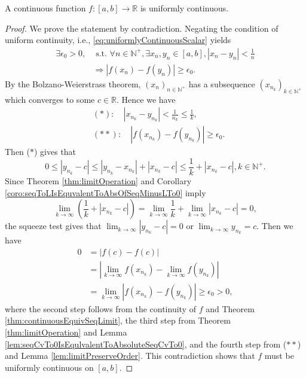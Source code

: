 \begin{thm}
  \label{thm:uniformContinuityScalarFunc}
  A continuous function $f: [a,b]\rightarrow \mathbb{R}$
  is uniformly continuous.
\end{thm}
\begin{proof}
  We prove the statement by contradiction.
  Negating the condition of uniform continuity, i.e.,
  \eqref{eq:uniformlyContinuousScalar} yields
  \begin{align*}
    \exists \epsilon_{0}>0, &\text{ s.t. }
    \forall n\in \mathbb{N}^{+}, \exists x_{n},y_{n}\in[a,b],
    |x_{n}-y_{n}|<\frac{1}{n}\\
    &\Rightarrow |f(x_{n})-f(y_{n})|\ge \epsilon_{0}. 
  \end{align*}
  By the Bolzano-Weierstrass theorem,
  $(x_{n})_{n\in \mathbb{N}^{+}}$ has a subsequence
  $(x_{n_{k}})_{k\in \mathbb{N}^{+}}$
  which converges to some $c\in \mathbb{R}$.
  Hence we have
  \begin{align*}
    &(*):\quad|x_{n_{k}}-y_{n_{k}}|<\frac{1}{n_{k}}\le \frac{1}{k},\\
    &(**):\quad |f(x_{n_{k}})-f(y_{n_{k}})|\ge \epsilon_{0}.
  \end{align*}
  Then ($\ast$) gives that
  \begin{displaymath}
    0\le|y_{n_{k}}-c|\le |y_{n_{k}}-x_{n_{k}}|+|x_{n_{k}}-c|
    \le \frac{1}{k}+|x_{n_{k}}-c|, k\in \mathbb{N}^{+}.
  \end{displaymath}
  Since Theorem \ref{thm:limitOperation} and
  Corollary \ref{coro:seqToLIsEquvalentToAbsOfSeqMinusLTo0} imply
  \begin{displaymath}
    \lim_{k\rightarrow \infty}\left(\frac{1}{k}+|x_{n_{k}}-c|\right)
  =\lim_{k\rightarrow \infty}\frac{1}{k}+
  \lim_{k\rightarrow \infty}|x_{n_{k}}-c|=0,
  \end{displaymath}
  the squeeze test gives that
  $\lim_{k\rightarrow\infty}|y_{n_{k}}-c|=0$ or
  $\lim_{k\rightarrow\infty}y_{n_{k}}=c$. Then we have
  \begin{align*}
    0&=|f(c)-f(c)|\\
     &=\left|\lim_{k\rightarrow\infty}f(x_{n_{k}})
       -\lim_{k\rightarrow\infty}f(y_{n_{k}})\right|\\
     &=\lim_{k\rightarrow\infty}|f(x_{n_{k}})-f(y_{n_{k}})|
    \ge \epsilon_{0}>0,
  \end{align*}
  where the second step follows from the continuity
  of $f$ and Theorem \ref{thm:continuousEquivSeqLimit},
  the third step from Theorem \ref{thm:limitOperation} and
  Lemma \ref{lem:seqCvTo0IsEqulvalentToAbsoluteSeqCvTo0},
  and the fourth step from ($\ast\ast$) and
  Lemma \ref{lem:limitPreserveOrder}. This contradiction
  shows that $f$ must be uniformly continuous on $[a,b]$.
\end{proof}

